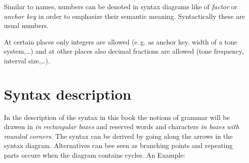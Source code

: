 \iffalse
Zahlen können ganzzahlig oder mit Dezimalpunkt geschrieben werden.
Eine Schreibweise mit Zehnerexponent ist nicht
zugelassen.\index{Zahlen} Ferner kann eine Zahl auch mit dem Zeichen
{\bf \#}\index{*#@\#} beginnen und weitere Hex-Ziffern\index{Hex-Ziffern}
enthalten. Diese Schreibweise bedeutet, daß die Zahl zur Basis 16
ausgewertet wird. In dieser Hex-Schreibweise ist kein Dezimalpunkt
erlaubt, folglich sind nur ganzzahlige Werte darstellbar.
\fi

Similar to names, numbers can be denoted in syntax diagrams like
of \textit{factor} or \textit{anchor key} in order to emphasize their
semantic meaning. Syntactically these are usual numbers.
\iffalse
Ähnlich wie bei Namen werden Zahlen im Syntaxdiagramm auch als {\it Faktor}
oder {\it Verankerungs-Taste} bezeichnet,
um ihre jeweilige semantische Bedeutung
hervorzuheben. Es handelt sich aber syntaktisch gesehen um ganz gewöhnliche
Zahlen.
\fi

At certain places only integers are allowed (e.\,g. as anchor key,
width of a tone system,\ldots) and at other places also decimal
fractions are allowed (tone frequency, interval size,\ldots).
\iffalse
An einigen Stellen sind nur ganze Zahlen zugelassen (z.\,B. als
Verankerungs-Taste, Tonsystem-Breite,\ldots) und an anderen Stellen
sind auch Komma-Zahlen zugelassen, (Tonfrequenz,
In\-ter\-vall\-gr"o"se,\ldots).
\fi



\chapter{Syntax description}\label{cha:syntax-schreibweise}
\label{drei}

In the description of the syntax in this book the notions of grammar
will be drawen in \emph{in rectangular boxes} and reserved words and
characters \emph{in boxes with rounded corners}. The syntax can be
derived by going along the arrows in the syntax diagram. Alternatives
can bee seen as branching points and repeating parts occure when the
diagram contains cycles. An Example:
\iffalse
In der Syntax-Darstellung in diesem Buch werden die Grammatikbegriffe
{\it in eckigen Kästchen} und reservierte Worte und Zeichen {\it in
ovalen Kästchen} geschrieben. Die Syntax erhält man, indem man auf den
Pfeilen entlang durch das Syntaxdiagramm läuft.
Alternative Formulierungen erscheinen dabei als Verzweigungen
und Wiederholungen ergeben sich, indem das Syntaxdiagramm Zyklen enthält.
Ein Beispiel:
\fi

